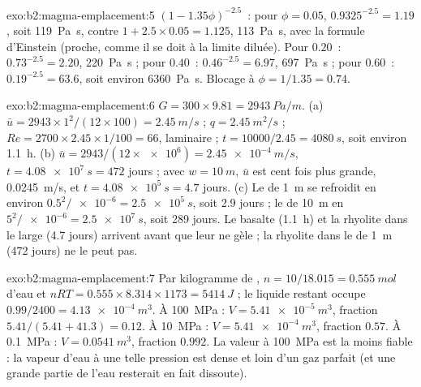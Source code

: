 \begin{solution}{exo:b2:magma-emplacement:5}
$(1 - 1.35\phi)^{-2.5}$~: pour $\phi = 0.05$, $0.9325^{-2.5} = 1.19$, soit
\qty{119}{Pa.s}, contre $1 + 2.5\times0.05 = 1.125$, \qty{113}{Pa.s}, avec la formule d'Einstein
(proche, comme il se doit à la limite diluée). Pour $0.20$~: $0.73^{-2.5} =
2.20$, \qty{220}{Pa.s} ; pour $0.40$~: $0.46^{-2.5} = 6.97$, \qty{697}{Pa.s} ; pour $0.60$~:
$0.19^{-2.5} = 63.6$, soit environ \qty{6360}{Pa.s}. Blocage à $\phi = 1/1.35 = 0.74$.
\end{solution}

\begin{solution}{exo:b2:magma-emplacement:6}
$G = 300\times9.81 = \qty{2943}{Pa/m}$. (a) $\bar u = 2943\times1^2/(12\times100) =
\qty{2.45}{m/s}$ ; $q = \qty{2.45}{m^2/s}$ ; $Re = 2700\times2.45\times1/100 = 66$, laminaire ;
$t = 10000/2.45 = \qty{4080}{s}$, soit environ \qty{1.1}{h}. (b) $\bar u =
2943/(12\times\num{e6}) = \qty{2.45e-4}{m/s}$, $t = \qty{4.08e7}{s} = 472$ jours ; avec
$w = \qty{10}{m}$, $\bar u$ est cent fois plus grande, \qty{0.0245}{m/s}, et $t =
\qty{4.08e5}{s} = 4.7$ jours. (c) Le  de \qty{1}{m} se refroidit en environ
$0.5^2/\num{e-6} = \qty{2.5e5}{s}$, soit 2.9 jours ; le  de \qty{10}{m} en $5^2/\num{e-6} =
\qty{2.5e7}{s}$, soit 289 jours. Le basalte (\qty{1.1}{h}) et la rhyolite dans le  large
(4.7 jours) arrivent avant que leur  ne gèle ; la rhyolite dans le
 de \qty{1}{m} (472 jours) ne le peut pas.
\end{solution}

\begin{solution}{exo:b2:magma-emplacement:7}
Par kilogramme de , $n = 10/18.015 = \qty{0.555}{mol}$ d'eau et $nRT =
0.555\times8.314\times1173 = \qty{5414}{J}$ ; le liquide restant occupe $0.99/2400 =
\qty{4.13e-4}{m^3}$. À \qty{100}{MPa} : $V = \qty{5.41e-5}{m^3}$, fraction
$5.41/(5.41 + 41.3) = 0.12$. À \qty{10}{MPa} : $V = \qty{5.41e-4}{m^3}$, fraction
$0.57$. À \qty{0.1}{MPa} : $V = \qty{0.0541}{m^3}$, fraction $0.992$. La valeur à
\qty{100}{MPa} est la moins fiable : la vapeur d'eau à une telle pression est dense et
loin d'un gaz parfait (et une grande partie de l'eau resterait en fait dissoute).
\end{solution}

